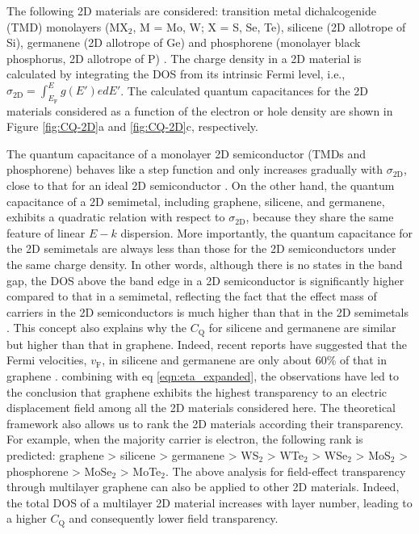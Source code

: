 \documentclass[journal=nalefd]{achemso}
\newcommand*\subs[1]{_{\text{#1}}} %
\newcommand*\change[1]{{#1}}
\begin{document}
The following 2D materials are considered:  transition metal dichalcogenide (TMD) 
monolayers (MX$\subs{2}$, M = Mo, W; X = S, Se, Te), silicene (2D allotrope of Si), germanene (2D allotrope of Ge)
\change{
  and phosphorene (monolayer black phosphorus, 2D allotrope of P)
}.
The charge density in a 2D material is calculated by integrating the DOS from its intrinsic Fermi level, i.e., $\sigma\subs{2D}=\int_{E\subs{F}}^{E}  g(E')e dE'$.
The calculated quantum capacitances for the 2D materials considered as a function of the electron or hole density are shown in Figure \ref{fig:CQ-2D}a and \ref{fig:CQ-2D}c, respectively. 

The quantum capacitance of a monolayer 2D semiconductor (\change{TMDs and phosphorene}) behaves like a step function and only increases gradually with $\sigma\subs{2D}$, close to that for an ideal 2D semiconductor \cite{Davies1997Physics}. 
On the other hand, the quantum capacitance of a 2D semimetal, including graphene, silicene, and germanene, exhibits a quadratic relation with respect to $\sigma\subs{2D}$, because they share the same feature of linear $E-k$ dispersion. 
More importantly, the quantum capacitance for the 2D semimetals are always less than those for the 2D semiconductors under the same charge density. In other words, although there is no states in the band gap, the DOS above the band edge in a 2D semiconductor is significantly higher compared to that in a semimetal, reflecting the fact that the effect mass of carriers in the 2D semiconductors is much higher than that in the 2D semimetals \cite{Davies1997Physics}. 
This concept also explains why the $C\subs{Q}$ for silicene and germanene are similar but higher than that in graphene. Indeed, recent reports have suggested that the Fermi velocities, $v\subs{F}$, in silicene and germanene are only about 60\% of that in graphene \cite{yan2013electron,bechstedt2012infrared}. 
combining with eq \ref{eqn:eta_expanded}, the observations have led to the conclusion that graphene exhibits the highest transparency to an electric displacement field among all the 2D materials considered here.
The theoretical framework also allows us to rank the 2D materials according their transparency. For example, when the majority carrier is electron, the following rank is predicted: 
\change{graphene > silicene > germanene > WS$\subs{2}$ > WTe$\subs{2}$ > WSe$\subs{2}$ > MoS$\subs{2}$ > phosphorene > MoSe$\subs{2}$ > MoTe$\subs{2}$.
}
\change{
The above analysis for field-effect transparency through multilayer graphene can also be applied to other 2D materials. 
Indeed, the total DOS of a multilayer 2D material increases with layer number, leading to a higher $C\subs{Q}$ and consequently lower field transparency.
}
\end{document}
